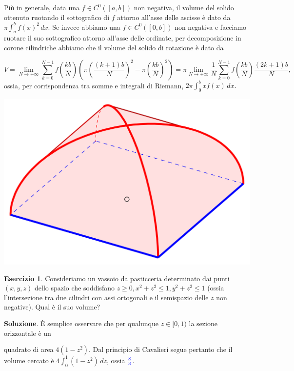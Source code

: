 \documentclass[a4paper,twoside]{article}
\theoremstyle{definition}
\newtheorem{ex}[theorem]{Esercizio}
\numberwithin{theorem}{section}
\begin{document}
Più in generale, data una $f\in C^{0}([a,b])$ non negativa, il volume del solido ottenuto ruotando il sottografico di $f$ attorno all'asse delle ascisse è dato da $\pi\int_{a}^{b}f(x)^2\,dx$. Se invece abbiamo una $f\in C^0([0,b])$ non negativa e facciamo ruotare il suo sottografico attorno all'asse delle ordinate, per decomposizione in corone cilindriche abbiamo che il volume del solido di rotazione è dato da

$$ V=\lim_{N\to +\infty} \sum_{k=0}^{N-1} f\left(\frac{kb}{N}\right)\left(\pi\left(\frac{(k+1)b}{N}\right)^2-\pi\left(\frac{kb}{N}\right)^2\right)=\pi\lim_{N\to +\infty}\frac{1}{N}\sum_{k=0}^{N-1}f\left(\frac{kb}{N}\right)\frac{(2k+1)b}{N}, $$
ossia, per corrispondenza tra somme e integrali di Riemann, $2\pi\int_{0}^{b} x f(x)\,dx.$\\


\begin{minipage}{0.25\textwidth}
\includegraphics[scale=0.06]{Klostergew.png} 
\end{minipage}
\begin{minipage}{0.75\textwidth}
\vspace{4mm}
\begin{ex} Consideriamo un vassoio da pasticceria determinato dai punti $(x,y,z)$ dello spazio che soddisfano $z\geq 0, x^2+z^2\leq 1, y^2+z^2\leq 1$ (ossia l'intersezione tra due cilindri con assi ortogonali e il semispazio delle $z$ non negative). Qual è il suo volume? 
\end{ex}
\textbf{Soluzione}. È semplice osservare che per qualunque $z\in[0,1)$ la sezione orizzontale è un 
\end{minipage}
quadrato di area $4(1-z^2)$. Dal principio di Cavalieri segue pertanto che il volume cercato è $4\int_{0}^{1}(1-z^2)\,dz$, ossia $\color{blue}\frac{8}{3}$.
\end{document}
